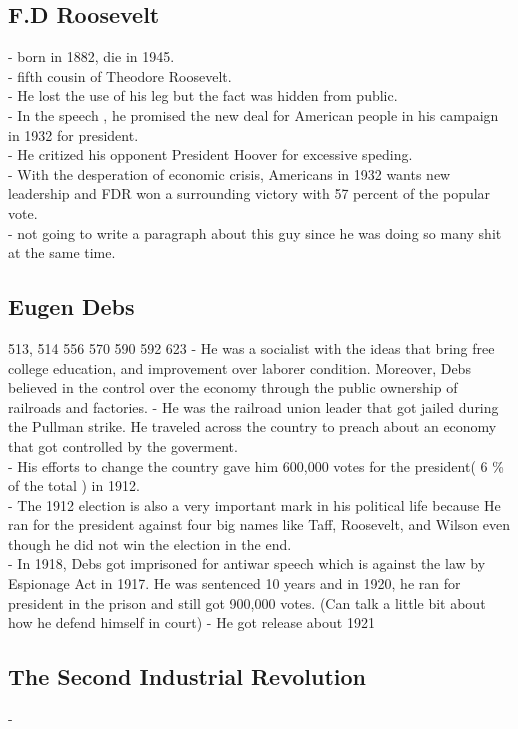 \documentclass{article}
\begin{document}
\subsection{ F.D Roosevelt}
- born in 1882, die in 1945.\\
- fifth cousin of Theodore Roosevelt.\\
- He lost the use of his leg but the fact was hidden from public. \\
- In the speech , he promised the new deal for American people in his campaign in 1932 for president.\\
- He critized his opponent President Hoover for excessive speding. \\
- With the desperation of economic crisis, Americans in 1932 wants new leadership and FDR won a surrounding victory with 57 percent of the popular vote.\\
- not going to write a paragraph about this guy since he was doing so many shit at the same time.\\

\subsection{ Eugen Debs }
513, 514 556 570 590 592 623
- He was a socialist with the ideas that bring free college education, and improvement over laborer condition. Moreover, Debs believed in the control over the economy through the public ownership of railroads and factories.
- He was the railroad union leader that got jailed during the Pullman strike. He traveled across the country to preach about an economy that got controlled by the goverment.\\
- His efforts to change the country gave him 600,000 votes for the president( 6 \% of the total ) in 1912.\\
- The 1912 election is also a very important mark in his political life because He ran for the president against four big names like Taff, Roosevelt, and Wilson even though he did not win the election in the end.\\
- In 1918, Debs got imprisoned for antiwar speech which is against the law by Espionage Act in 1917. He was sentenced 10 years and in 1920, he ran for president in the prison and still got 900,000 votes. (Can talk a little bit about how he defend himself in court)
- He got release about 1921\\
\subsection{ The Second Industrial Revolution}
- 
\end{document}
